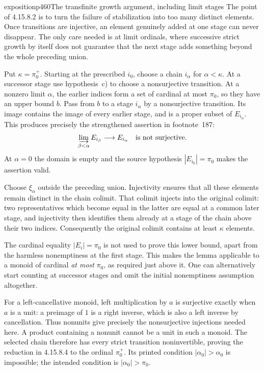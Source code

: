 \begin{dcomment}{exposition}{p460}{The transfinite growth argument, including limit stages}
The point of 4.15.8.2 is to turn the failure of stabilization into too many distinct elements. Once transitions are injective, an element genuinely added at one stage can never disappear. The only care needed is at limit ordinals, where successive strict growth by itself does not guarantee that the next stage adds something beyond the whole preceding union.

Put $\kappa=\pi_0^+$. Starting at the prescribed $i_0$, choose a chain $i_\alpha$ for $\alpha<\kappa$. At a successor stage use hypothesis~c) to choose a nonsurjective transition. At a nonzero limit $\alpha$, the earlier indices form a set of cardinal at most $\pi_0$, so they have an upper bound $b$. Pass from $b$ to a stage $i_\alpha$ by a nonsurjective transition. Its image contains the image of every earlier stage, and is a proper subset of $E_{i_\alpha}$. This produces precisely the strengthened assertion in footnote~187:
\[
\varinjlim_{\beta<\alpha}E_{i_\beta}\longrightarrow E_{i_\alpha}
\quad\hbox{is not surjective}.
\]
At $\alpha=0$ the domain is empty and the source hypothesis $|E_{i_0}|=\pi_0$ makes the assertion valid.

Choose $\xi_\alpha$ outside the preceding union. Injectivity ensures that all these elements remain distinct in the chain colimit. That colimit injects into the original colimit: two representatives which become equal in the latter are equal at a common later stage, and injectivity then identifies them already at a stage of the chain above their two indices. Consequently the original colimit contains at least $\kappa$ elements.

The cardinal equality $|E_i|=\pi_0$ is not used to prove this lower bound, apart from the harmless nonemptiness at the first stage. This makes the lemma applicable to a monoid of cardinal \emph{at most} $\pi_0$, as required just above it. One can alternatively start counting at successor stages and omit the initial nonemptiness assumption altogether.

For a left-cancellative monoid, left multiplication by $a$ is surjective exactly when $a$ is a unit: a preimage of $1$ is a right inverse, which is also a left inverse by cancellation. Thus nonunits give precisely the nonsurjective injections needed here. A product containing a nonunit cannot be a unit in such a monoid. The selected chain therefore has every strict transition noninvertible, proving the reduction in 4.15.8.4 to the ordinal $\pi_0^+$. Its printed condition $|\alpha_0|>\alpha_0$ is impossible; the intended condition is $|\alpha_0|>\pi_0$.
\end{dcomment}

